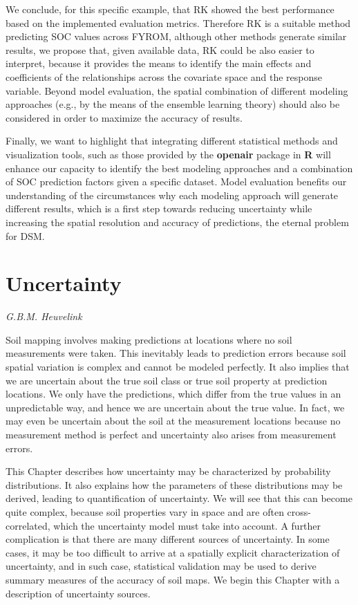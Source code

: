 \documentclass[10pt,b5paper,]{book}
\theoremstyle{definition}
\theoremstyle{definition}
\theoremstyle{definition}
\theoremstyle{remark}
\begin{document}
We conclude, for this specific example, that RK showed the best
performance based on the implemented evaluation metrics. Therefore RK is
a suitable method predicting SOC values across FYROM, although other
methods generate similar results, we propose that, given available data,
RK could be also easier to interpret, because it provides the means to
identify the main effects and coefficients of the relationships across
the covariate space and the response variable. Beyond model evaluation,
the spatial combination of different modeling approaches (e.g., by the
means of the ensemble learning theory) should also be considered in
order to maximize the accuracy of results.

Finally, we want to highlight that integrating different statistical
methods and visualization tools, such as those provided by the
\textbf{openair} package in \textbf{R} \citep{openair} will enhance our
capacity to identify the best modeling approaches and a combination of
SOC prediction factors given a specific dataset. Model evaluation
benefits our understanding of the circumstances why each modeling
approach will generate different results, which is a first step towards
reducing uncertainty while increasing the spatial resolution and
accuracy of predictions, the eternal problem for DSM.

\hypertarget{uncertainty}{%
\chapter{Uncertainty}\label{uncertainty}}

\emph{G.B.M. Heuvelink}

Soil mapping involves making predictions at locations where no soil
measurements were taken. This inevitably leads to prediction errors
because soil spatial variation is complex and cannot be modeled
perfectly. It also implies that we are uncertain about the true soil
class or true soil property at prediction locations. We only have the
predictions, which differ from the true values in an unpredictable way,
and hence we are uncertain about the true value. In fact, we may even be
uncertain about the soil at the measurement locations because no
measurement method is perfect and uncertainty also arises from
measurement errors.

This Chapter describes how uncertainty may be characterized by
probability distributions. It also explains how the parameters of these
distributions may be derived, leading to quantification of uncertainty.
We will see that this can become quite complex, because soil properties
vary in space and are often cross-correlated, which the uncertainty
model must take into account. A further complication is that there are
many different sources of uncertainty. In some cases, it may be too
difficult to arrive at a spatially explicit characterization of
uncertainty, and in such case, statistical validation may be used to
derive summary measures of the accuracy of soil maps. We begin this
Chapter with a description of uncertainty sources.
\end{document}
